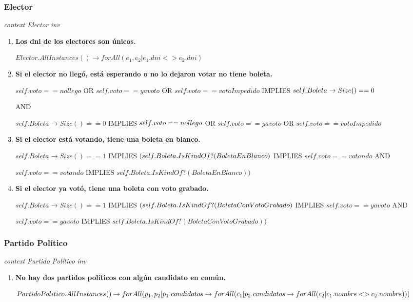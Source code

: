 \subsubsection*{Elector}

\textit{context Elector
inv}

\begin{enumerate}
\item \textbf{Los dni de los electores son únicos.}

$Elector.AllInstances() \rightarrow forAll(e_1, e_2 | e_1.dni <> e_2.dni)$

\item \textbf{Si el elector no llegó, está esperando o no lo dejaron votar no tiene boleta.}

$self.voto==nollego $ OR $self.voto==yavoto$ OR $self.voto==votoImpedido$ IMPLIES $\\
self.Boleta \rightarrow Size() ==0$

 AND 
 
$self.Boleta \rightarrow Size() ==0$ IMPLIES $\\
self.voto==nollego $ OR $self.voto==yavoto$ OR $self.voto==votoImpedido$

\item \textbf{Si el elector está votando, tiene una boleta en blanco.}

$self.Boleta \rightarrow Size() ==1$ IMPLIES $\\
(self.Boleta.IsKindOf?(BoletaEnBlanco)$ IMPLIES $self.voto==votando$ AND

$self.voto==votando$ IMPLIES $self.Boleta.IsKindOf?(BoletaEnBlanco))$

\item \textbf{Si el elector ya votó, tiene una boleta con voto grabado.}

$self.Boleta \rightarrow Size() ==1$ IMPLIES $\\
(self.Boleta.IsKindOf?(BoletaConVotoGrabado)$ IMPLIES $self.voto==yavoto$ AND

$self.voto==yavoto$ IMPLIES $self.Boleta.IsKindOf?(BoletaConVotoGrabado))$

\end{enumerate}

\subsubsection*{Partido Pol\'itico}

\textit{context Partido Pol\'itico
inv}

\begin{enumerate}
\item \textbf{No hay dos partidos políticos con algún candidato en común.}

$PartidoPolitico.AllInstances() \rightarrow \\
forAll(p_1, p_2 | p_1.candidatos \rightarrow \\
forAll(c_1 | p_2.candidatos \rightarrow \\
forAll(c_2 | c_1.nombre <> c_2.nombre)))$

\end{enumerate}

